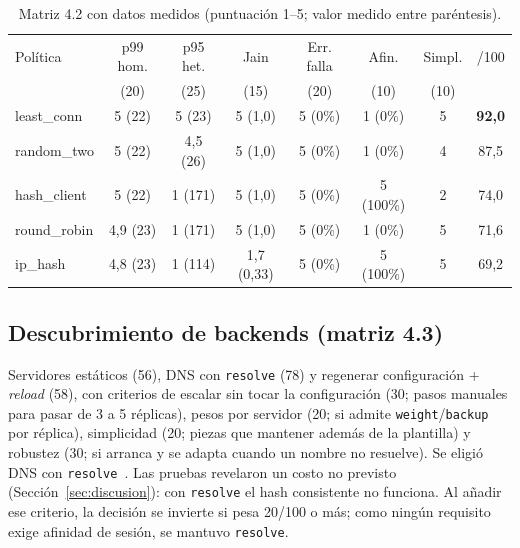\documentclass[conference]{IEEEtran}
\begin{document}
\begin{table}[t]
\caption{Matriz 4.2 con datos medidos (puntuación 1--5; valor medido entre paréntesis).}
\label{tab:m42}
\centering\scriptsize
\setlength{\tabcolsep}{3pt}
\begin{tabular}{lccccccc}
\toprule
Política & p99 hom. & p95 het. & Jain & Err. falla & Afin. & Simpl. & /100\\
 & (20) & (25) & (15) & (20) & (10) & (10) & \\
\midrule
least\_conn & 5 (22) & 5 (23) & 5 (1,0) & 5 (0\%) & 1 (0\%) & 5 & \textbf{92,0}\\
random\_two & 5 (22) & 4,5 (26) & 5 (1,0) & 5 (0\%) & 1 (0\%) & 4 & 87,5\\
hash\_client & 5 (22) & 1 (171) & 5 (1,0) & 5 (0\%) & 5 (100\%) & 2 & 74,0\\
round\_robin & 4,9 (23) & 1 (171) & 5 (1,0) & 5 (0\%) & 1 (0\%) & 5 & 71,6\\
ip\_hash & 4,8 (23) & 1 (114) & 1,7 (0,33) & 5 (0\%) & 5 (100\%) & 5 & 69,2\\
\bottomrule
\end{tabular}
\end{table}

\subsection{Descubrimiento de backends (matriz 4.3)}
Servidores estáticos (56), DNS con \texttt{resolve} (78) y regenerar configuración + \emph{reload} (58), con criterios de escalar sin tocar la configuración (30; pasos manuales para pasar de 3 a 5 réplicas), pesos por servidor (20; si admite \texttt{weight}/\texttt{backup} por réplica), simplicidad (20; piezas que mantener además de la plantilla) y robustez (30; si arranca y se adapta cuando un nombre no resuelve). Se eligió DNS con \texttt{resolve}~\cite{nginx_changes}. Las pruebas revelaron un costo no previsto (Sección~\ref{sec:discusion}): con \texttt{resolve} el hash consistente no funciona. Al añadir ese criterio, la decisión se invierte si pesa 20/100 o más; como ningún requisito exige afinidad de sesión, se mantuvo \texttt{resolve}.
\end{document}
